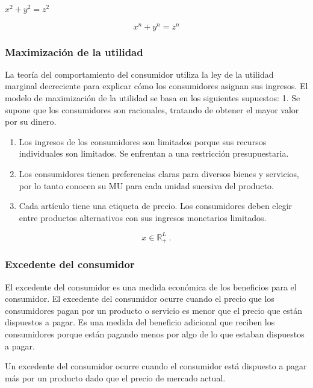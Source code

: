 \documentclass[
]{article}
\begin{document}
\(x^2 + y^2 = z^2\)

\[ x^n + y^n = z^n \]

\hypertarget{maximizaciuxf3n-de-la-utilidad}{%
\subsubsection{Maximización de la
utilidad}\label{maximizaciuxf3n-de-la-utilidad}}

La teoría del comportamiento del consumidor utiliza la ley de la
utilidad marginal decreciente para explicar cómo los consumidores
asignan sus ingresos. El modelo de maximización de la utilidad se basa
en los siguientes supuestos: 1. Se supone que los consumidores son
racionales, tratando de obtener el mayor valor por su dinero.

\begin{enumerate}
\def\labelenumi{\arabic{enumi}.}
\setcounter{enumi}{1}
\item
  Los ingresos de los consumidores son limitados porque sus recursos
  individuales son limitados. Se enfrentan a una restricción
  presupuestaria.
\item
  Los consumidores tienen preferencias claras para diversos bienes y
  servicios, por lo tanto conocen su MU para cada unidad sucesiva del
  producto.
\item
  Cada artículo tiene una etiqueta de precio. Los consumidores deben
  elegir entre productos alternativos con sus ingresos monetarios
  limitados.
\end{enumerate}

\[x \in \mathbb{R}^L_+ \ .\]

\hypertarget{excedente-del-consumidor}{%
\subsubsection{Excedente del
consumidor}\label{excedente-del-consumidor}}

El excedente del consumidor es una medida económica de los beneficios
para el consumidor. El excedente del consumidor ocurre cuando el precio
que los consumidores pagan por un producto o servicio es menor que el
precio que están dispuestos a pagar. Es una medida del beneficio
adicional que reciben los consumidores porque están pagando menos por
algo de lo que estaban dispuestos a pagar.

Un excedente del consumidor ocurre cuando el consumidor está dispuesto a
pagar más por un producto dado que el precio de mercado actual.
\end{document}
